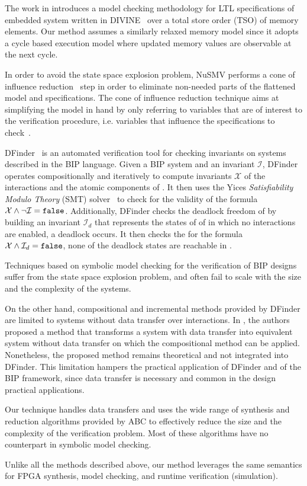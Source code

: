 The work in \cite{BarnatVMCAI2013} introduces a model checking
methodology for LTL specifications of embedded system written 
in DIVINE~\cite{Divine}  over
a total store order (TSO) of memory elements. 
Our method assumes a similarly relaxed memory model
since it adopts a cycle based execution model where 
updated memory values are observable at the next cycle. 

In order to avoid the state space explosion problem, NuSMV performs a cone of 
influence reduction~\cite{berezin1998compositional} step in order to eliminate
non-needed parts of the flattened model and specifications. The cone of influence
reduction technique aims at simplifying the model in hand by only 
referring to variables that are of interest to the verification procedure, i.e. variables
that influence the specifications to check~\cite{clarke1999model}.

DFinder~\cite{dfinder} is an automated verification tool for checking invariants
on systems described in the BIP language. Given a BIP system \Pm and 
an invariant $\mathcal{I}$, DFinder operates  compositionally and iteratively
to compute invariants $\mathcal{X}$ of the interactions and the atomic 
components of \Pm. It then uses the Yices {\em Satisfiability Modulo
Theory} (SMT) solver~\cite{dutertre2006fast} to check for the validity 
of the formula $\mathcal{X} \land \lnot \mathcal{I} = \mathtt{false}$. 
Additionally, DFinder checks the deadlock freedom of  \Pm by building an invariant 
$\mathcal{I}_d$ that represents the states of of \Pm in which no interactions 
are enabled, \ie{} a deadlock occurs. It then checks the for the formula
$\mathcal{X} \land \mathcal{I}_d = \mathtt{false}$, \ie{} none of the deadlock states
are reachable in \Pm.   

Techniques based on symbolic model checking for the verification of 
BIP designs suffer from the state space explosion problem, and often 
fail to scale with the size and the complexity of the systems. 



On the other hand, compositional and incremental methods provided by DFinder are limited to systems without data
transfer over interactions. In \cite{hungthesis10}, the authors proposed a method that transforms a system with data transfer into equivalent system without data transfer on which the compositional method can be applied. Nonetheless, the proposed method remains theoretical and not integrated into DFinder. This limitation hampers the practical application of DFinder and of the BIP framework, since data transfer is necessary and common in the design practical applications.


Our technique handles data transfers and uses the wide range of synthesis 
and reduction algorithms provided by ABC to effectively reduce the size and 
the complexity of the verification problem. Most of these algorithms have no counterpart
in symbolic model checking.  

Unlike all the methods described above, our method leverages
the same semantics for FPGA synthesis, model checking, 
and runtime verification (simulation). 
